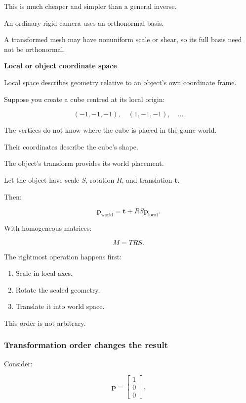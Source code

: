 This is much cheaper and simpler than a general inverse.

An ordinary rigid camera uses an orthonormal basis.

A transformed mesh may have nonuniform scale or shear, so its full basis need not be orthonormal.

\textbf{Local or object coordinate space}

Local space describes geometry relative to an object's own coordinate frame.

Suppose you create a cube centred at its local origin:

\[
 (-1,-1,-1),\quad (1,-1,-1),\quad\ldots
\]

The vertices do not know where the cube is placed in the game world.

Their coordinates describe the cube's shape.

The object's transform provides its world placement.

Let the object have scale \(S\), rotation \(R\), and translation \(\mathbf t\).

Then:

\[
 \boxed{ \mathbf p_{\mathrm{world}} = \mathbf t+RS\mathbf p_{\mathrm{local}} }.
\]

With homogeneous matrices:

\[
 \boxed{ M=TRS }.
\]

The rightmost operation happens first:

\begin{enumerate}
\def\labelenumi{\arabic{enumi}.}
\tightlist
\item
  Scale in local axes.
\item
  Rotate the scaled geometry.
\item
  Translate it into world space.
\end{enumerate}

This order is not arbitrary.

\subsubsection{Transformation order changes the result}\label{02-foundations-ii-ch032-transformation-order-changes-the-result}

\hypertarget{02-foundations-ii-ch032-transformation-order-changes-the-result}{}

Consider:

\[
 \mathbf p= \begin{bmatrix}1\\0\\0\end{bmatrix}.
\]

